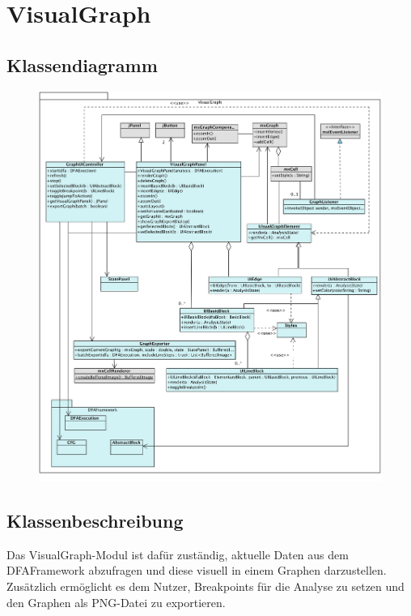 
\section{VisualGraph}

\subsection{Klassendiagramm}

\begin{figure}[H]
\centering
\includegraphics[width=1\textwidth]{Klassenuebersicht/VisualGraph/VisualGraph}
\end{figure}

\newpage

\subsection{Klassenbeschreibung}

Das VisualGraph-Modul ist dafür zuständig, aktuelle Daten aus dem DFAFramework abzufragen und diese visuell in einem Graphen darzustellen. 
Zusätzlich ermöglicht es dem Nutzer, Breakpoints für die Analyse zu setzen und den Graphen als PNG-Datei zu exportieren.

